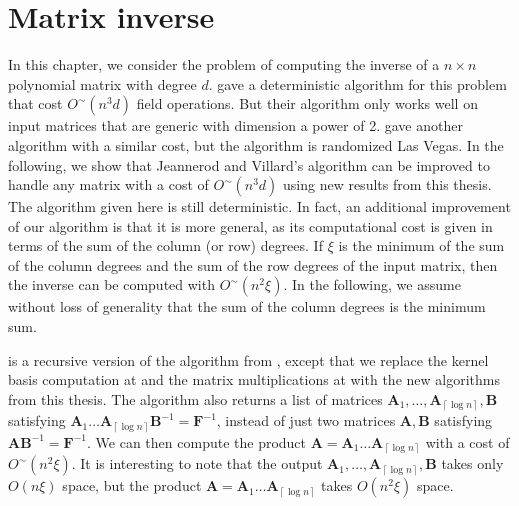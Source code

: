 
\chapter{\label{chap:Matrix-inverse}Matrix inverse}

In this chapter, we consider the problem of computing the inverse
of a $n\times n$ polynomial matrix with degree $d$. \citet{jeannerod-villard:05}
gave a deterministic algorithm for this problem that cost $O^{\sim}\left(n^{3}d\right)$
field operations. But their algorithm only works well on input matrices
that are generic with dimension a power of 2. \citet{storjohann:2008}
gave another algorithm with a similar cost, but the algorithm is randomized
Las Vegas. In the following, we show that Jeannerod and Villard's
algorithm can be improved to handle any matrix with a cost of $O^{\sim}\left(n^{3}d\right)$
using new results from this thesis. The algorithm given here is still
deterministic. In fact, an additional improvement of our algorithm
is that it is more general, as its computational cost is given in
terms of the sum of the column (or row) degrees. If $\xi$ is the
minimum of the sum of the column degrees and the sum of the row degrees
of the input matrix, then the inverse can be computed with $O^{\sim}\left(n^{2}\xi\right).$
In the following, we assume without loss of generality that the sum
of the column degrees is the minimum sum.



 is a recursive version of the algorithm
from \citet{jeannerod-villard:05}, except that we replace the kernel
basis computation at  and
the matrix multiplications at  with the
new algorithms from this thesis. The algorithm also returns a list
of matrices $\mathbf{A}_{1},\dots,\mathbf{A}_{\left\lceil \log n\right\rceil },\mathbf{B}$
satisfying $\mathbf{A}_{1}\dots\mathbf{A}_{\left\lceil \log n\right\rceil }\mathbf{B}^{-1}=\mathbf{F}^{-1}$,
instead of just two matrices $\mathbf{A},\mathbf{B}$ satisfying $\mathbf{A}\mathbf{B}^{-1}=\mathbf{F}^{-1}$.
We can then compute the product $\mathbf{A}=\mathbf{A}_{1}\dots\mathbf{A}_{\left\lceil \log n\right\rceil }$
with a cost of $O^{\sim}\left(n^{2}\xi\right)$. It is interesting
to note that the output $\mathbf{A}_{1},\dots,\mathbf{A}_{\left\lceil \log n\right\rceil },\mathbf{B}$
takes only $O(n\xi)$ space, but the product $\mathbf{A}=\mathbf{A}_{1}\dots\mathbf{A}_{\left\lceil \log n\right\rceil }$
takes $O(n^{2}\xi)$ space.

